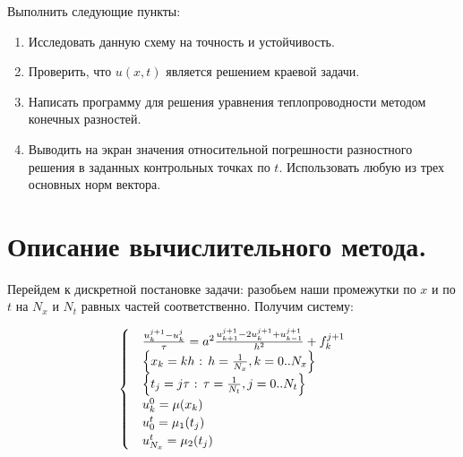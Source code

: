 \documentclass[12pt,a4paper]{scrartcl}
\begin{document}
Выполнить следующие пункты:
\begin{enumerate}
    \item Исследовать данную схему на точность и устойчивость.
    \item Проверить, что $u(x,t)$ является решением краевой задачи.
    \item Написать программу для решения уравнения теплопроводности методом конечных разностей.
    \item Выводить на экран значения относительной погрешности разностного решения в заданных контрольных точках по $t$. Использовать любую из трех основных норм вектора.
\end{enumerate}
\section{Описание вычислительного метода.}
Перейдем к дискретной постановке задачи: разобьем наши промежутки по $x$ и по $t$ на $N_x$ и $N_t$ равных частей соответственно. Получим систему:

\begin{align}
    \begin{cases}
        &\frac{u^{j+1}_k-u^{j}_k}{\tau} = a^{2} \frac{u^{j+1}_{k+1}-2 u^{j+1}_k+u^{j+1}_{k-1}}{h^{2}}+f^{j+1}_k\\
        &\Bigl\{x_k = k h $ : $ h = \frac {1}{N_x}, k = 0 ..N_x\Bigr\}\\
        &\Bigl\{t_j = j \tau $ : $ \tau =\frac {1}{N_t}, j = 0 ..N_t \Bigr\}\\ \label{dis}
        &u^{0}_k = \mu(x_k) \\
        &u^{t}_0 = \mu_1(t_j) \\
        &u^{t}_{N_{x}} = \mu_2(t_j) \\ 
    \end{cases}
\end{align}
\end{document}
